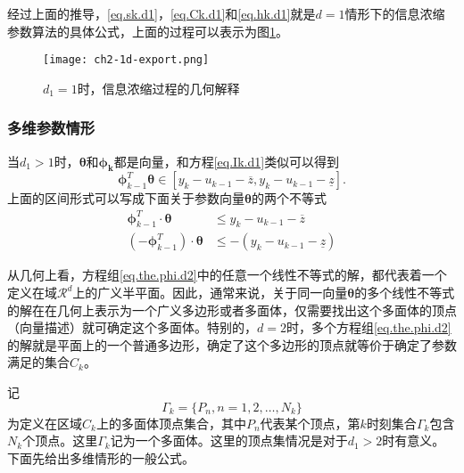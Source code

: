经过上面的推导，\eqref{eq.sk.d1}，\eqref{eq.Ck.d1}和\eqref{eq.hk.d1}就是$d=1$情形下的信息浓缩参数算法的具体公式，上面的过程可以表示为图\ref{fig.1d.export}。
\begin{figure}
	\centering
	\texttt{[image: ch2-1d-export.png]}\\	 %
	\caption{$d_{1}=1$时，信息浓缩过程的几何解释}
	\label{fig.1d.export}
\end{figure}

\subsubsection{多维参数情形}\label{subsubsect:2.3.3.2}
当$d_{1}>1$时，$\bm{\theta}$和$\bm{\phi_{k}}$都是向量，和方程\eqref{eq.Ik.d1}类似可以得到
\begin{equation}%
\label{eq.the.phi.d2}
\bm{\phi}_{k-1}^{T}\bm{\theta}\in[y_{k}-u_{k-1}-\overline{z},y_{k}-u_{k-1}-\underline{z}].
\end{equation}
上面的区间形式可以写成下面关于参数向量$\bm{\theta}$的两个不等式
\begin{equation}%
\label{eq.the.phi.d2}
\begin{split}%
\bm{\phi}_{k-1}^{T}\cdot\bm{\theta}&\leq y_{k}-u_{k-1}-\overline{z}\\
(-\bm{\phi}_{k-1}^{T})\cdot\bm{\theta}&\leq -(y_{k}-u_{k-1}-\underline{z})
\end{split}
\end{equation}

从几何上看，方程组\eqref{eq.the.phi.d2}中的任意一个线性不等式的解，都代表着一个定义在域$\mathcal{R}^{d}$上的广义半平面。因此，通常来说，关于同一向量$\bm{\theta}$的多个线性不等式的解在在几何上表示为一个广义多边形或者多面体，仅需要找出这个多面体的顶点（向量描述）就可确定这个多面体。特别的，$d=2$时，多个方程组\eqref{eq.the.phi.d2}的解就是平面上的一个普通多边形，确定了这个多边形的顶点就等价于确定了参数满足的集合$C_{k}$。

记
\begin{equation}%
\label{eq.Vk}
\Gamma_{k}=\{P_{n},n=1,2,\ldots,N_{k}\}
\end{equation}
为定义在区域$C_{k}$上的多面体顶点集合，其中$P_{n}$代表某个顶点，第$k$时刻集合$\Gamma_{k}$包含$N_{k}$个顶点。这里$\Gamma_{k}$记为一个多面体。这里的顶点集情况是对于$d_{1}>2$时有意义。下面先给出多维情形的一般公式。

